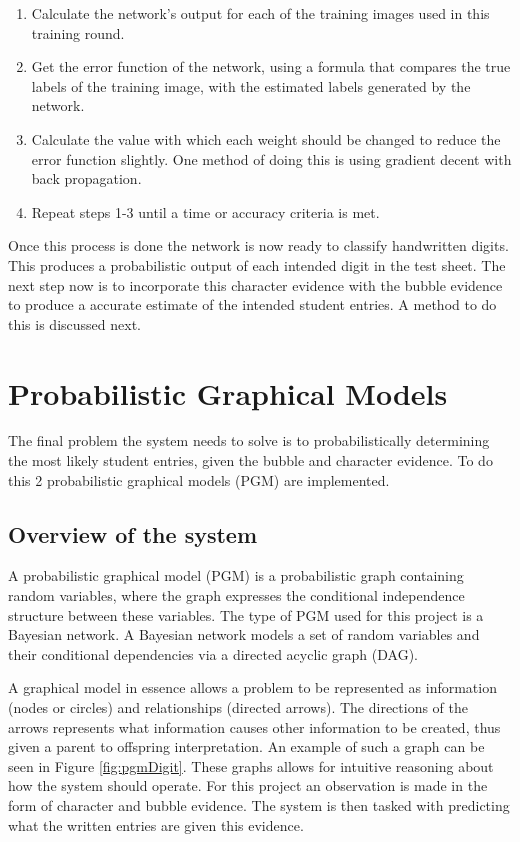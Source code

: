 \begin{enumerate}
\item Calculate the network's output for each of the training images used in this training round.
\item Get the error function of the network, using a formula that compares the true labels of the training image, with the estimated labels generated by the network.
\item Calculate the value with which each weight should be changed to reduce the error function slightly. One method of doing this is using gradient decent with back propagation.
\item Repeat steps 1-3 until a time or accuracy criteria is met.
\end{enumerate}

Once this process is done the network is now ready to classify handwritten digits. This produces a probabilistic output of each intended digit in the test sheet. The next step now is to incorporate this character evidence with the bubble evidence to produce a accurate estimate of the intended student entries. A method to do this is discussed next.

\section{Probabilistic Graphical Models}
\label{sec:PGM}
The final problem the system needs to solve is to probabilistically determining the most likely student entries, given the bubble and character evidence. To do this 2 probabilistic graphical models (PGM) are implemented.

\subsection{Overview of the system}
A probabilistic graphical model (PGM) is a probabilistic graph containing random variables, where the graph expresses the conditional independence structure between these variables. The type of PGM used for this project is a Bayesian network. A Bayesian network models a set of random variables and their conditional dependencies via a directed acyclic graph (DAG).

A graphical model in essence allows a problem to be represented as information (nodes or circles) and relationships (directed arrows). The directions of the arrows represents what information causes other information to be created, thus given a parent to offspring interpretation. An example of such a graph can be seen in Figure \ref{fig:pgmDigit}. These graphs allows for intuitive reasoning about how the system should operate. For this project an observation is made in the form of character and bubble evidence. The system is then tasked with predicting what the written entries are given this evidence.

